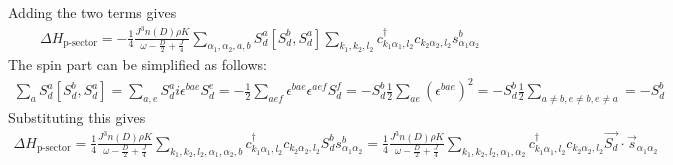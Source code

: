 \documentclass[12pt]{revtex4-2}
\begin{document}
Adding the two terms gives
\begin{equation}\begin{aligned}
	\Delta H_\text{p-sector} = -\frac{1}{4}\frac{J^3 n(D) \rho K}{\omega - \frac{D}{2} + \frac{J}{4}}\sum_{\alpha_1,\alpha_2,a,b} S_d^a \left[S_d^b, S_d^a\right] \sum_{k_1,k_2,l_2} c^\dagger_{k_1\alpha_1,l_2}c_{k_2 \alpha_2,l_2}s^b_{\alpha_1 \alpha_2}
\end{aligned}\end{equation}
The spin part can be simplified as follows:
\begin{equation}\begin{aligned}
	\sum_a S_d^a \left[S_d^b, S_d^a\right] = \sum_{a,e}S_d^a i \epsilon^{bae}S_d^e = -\frac{1}{2}\sum_{aef}\epsilon^{bae}\epsilon^{aef}S_d^f = -S_d^b\frac{1}{2}\sum_{ae}\left(\epsilon^{bae}\right)^2 = -S_d^b\frac{1}{2}\sum_{a\neq b, e\neq b, e \neq a} = - S_d^b
\end{aligned}\end{equation}
Substituting this gives
\begin{equation}\begin{aligned}
	\Delta H_\text{p-sector} = \frac{1}{4}\frac{J^3 n(D) \rho K}{\omega - \frac{D}{2} + \frac{J}{4}} \sum_{k_1,k_2,l_2,\alpha_1,\alpha_2,b} c^\dagger_{k_1\alpha_1,l_2}c_{k_2 \alpha_2,l_2} S_d^b s^b_{\alpha_1 \alpha_2} = \frac{1}{4}\frac{J^3 n(D) \rho K}{\omega - \frac{D}{2} + \frac{J}{4}} \sum_{k_1,k_2,l_2,\alpha_1,\alpha_2} c^\dagger_{k_1\alpha_1,l_2}c_{k_2 \alpha_2,l_2} \vec{S_d}\cdot\vec{s}_{\alpha_1\alpha_2}
\end{aligned}\end{equation}

\end{document}
